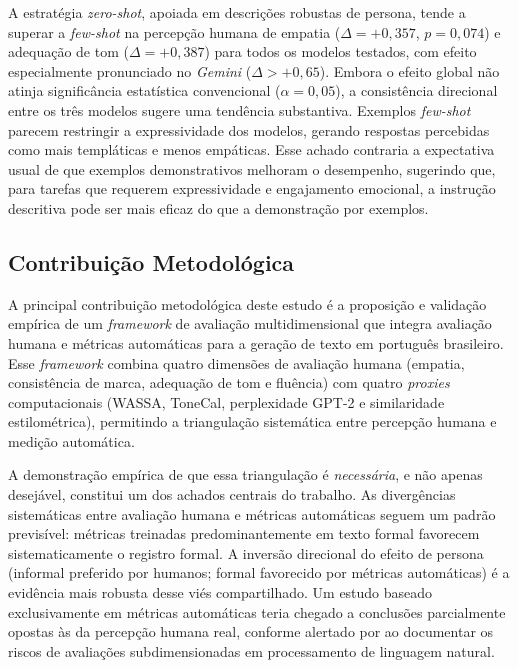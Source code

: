 \documentclass[12pt, a4paper]{article}
\numberwithin{equation}{section}
\begin{document}
A estratégia \textit{zero-shot}, apoiada em descrições robustas de persona, tende a superar a \textit{few-shot} na percepção humana de empatia ($\Delta = +0{,}357$, $p = 0{,}074$) e adequação de tom ($\Delta = +0{,}387$) para todos os modelos testados, com efeito especialmente pronunciado no \textit{Gemini} ($\Delta > +0{,}65$). Embora o efeito global não atinja significância estatística convencional ($\alpha = 0{,}05$), a consistência direcional entre os três modelos sugere uma tendência substantiva. Exemplos \textit{few-shot} parecem restringir a expressividade dos modelos, gerando respostas percebidas como mais templáticas e menos empáticas. Esse achado contraria a expectativa usual de que exemplos demonstrativos melhoram o desempenho, sugerindo que, para tarefas que requerem expressividade e engajamento emocional, a instrução descritiva pode ser mais eficaz do que a demonstração por exemplos.

\subsection{Contribuição Metodológica}

A principal contribuição metodológica deste estudo é a proposição e validação empírica de um \textit{framework} de avaliação multidimensional que integra avaliação humana e métricas automáticas para a geração de texto em português brasileiro. Esse \textit{framework} combina quatro dimensões de avaliação humana (empatia, consistência de marca, adequação de tom e fluência) com quatro \textit{proxies} computacionais (WASSA, ToneCal, perplexidade GPT-2 e similaridade estilométrica), permitindo a triangulação sistemática entre percepção humana e medição automática.

A demonstração empírica de que essa triangulação é \textit{necessária}, e não apenas desejável, constitui um dos achados centrais do trabalho. As divergências sistemáticas entre avaliação humana e métricas automáticas seguem um padrão previsível: métricas treinadas predominantemente em texto formal favorecem sistematicamente o registro formal. A inversão direcional do efeito de persona (informal preferido por humanos; formal favorecido por métricas automáticas) é a evidência mais robusta desse viés compartilhado. Um estudo baseado exclusivamente em métricas automáticas teria chegado a conclusões parcialmente opostas às da percepção humana real, conforme alertado por  ao documentar os riscos de avaliações subdimensionadas em processamento de linguagem natural.
\end{document}
